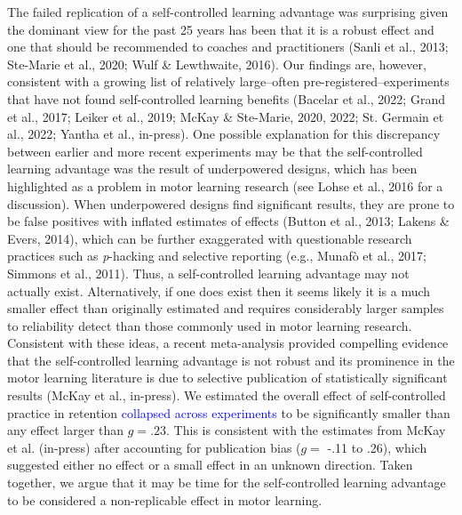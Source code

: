 \documentclass[
  man, donotrepeattitle,floatsintext]{apa7}
\begin{document}
The failed replication of a self-controlled learning advantage was surprising given the dominant view for the past 25 years has been that it is a robust effect and one that should be recommended to coaches and practitioners (Sanli et al., 2013; Ste-Marie et al., 2020; Wulf \& Lewthwaite, 2016). Our findings are, however, consistent with a growing list of relatively large--often pre-registered--experiments that have not found self-controlled learning benefits (Bacelar et al., 2022; Grand et al., 2017; Leiker et al., 2019; McKay \& Ste-Marie, 2020, 2022; St. Germain et al., 2022; Yantha et al., in-press). One possible explanation for this discrepancy between earlier and more recent experiments may be that the self-controlled learning advantage was the result of underpowered designs, which has been highlighted as a problem in motor learning research (see Lohse et al., 2016 for a discussion). When underpowered designs find significant results, they are prone to be false positives with inflated estimates of effects (Button et al., 2013; Lakens \& Evers, 2014), which can be further exaggerated with questionable research practices such as \emph{p}-hacking and selective reporting (e.g., Munafò et al., 2017; Simmons et al., 2011). Thus, a self-controlled learning advantage may not actually exist. Alternatively, if one does exist then it seems likely it is a much smaller effect than originally estimated and requires considerably larger samples to reliability detect than those commonly used in motor learning research. Consistent with these ideas, a recent meta-analysis provided compelling evidence that the self-controlled learning advantage is not robust and its prominence in the motor learning literature is due to selective publication of statistically significant results (McKay et al., in-press). We estimated the overall effect of self-controlled practice in retention \textcolor{blue}{collapsed across experiments} to be significantly smaller than any effect larger than \(g = .23\). This is consistent with the estimates from McKay et al. (in-press) after accounting for publication bias (\(g =\) -.11 to .26), which suggested either no effect or a small effect in an unknown direction. Taken together, we argue that it may be time for the self-controlled learning advantage to be considered a non-replicable effect in motor learning.
\end{document}

